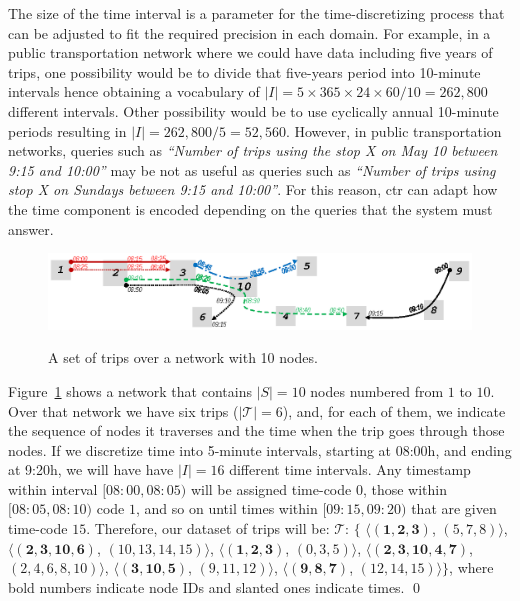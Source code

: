 	The size of the time interval is a parameter for the time-discretizing process
	that can be adjusted to fit the required precision in each domain.
	For example, in a public
	transportation network where we could have data including five years of trips, one
	possibility would be to divide that five-years period into
	10-minute intervals hence obtaining a
	vocabulary of $|I|=5\times 365 \times 24 \times 60/10 = 262,800$ different intervals. 
	Other possibility would
	be to use cyclically annual 10-minute periods resulting in $|I|=262,800 / 5 = 52,560$. 
	However,  in public transportation networks, queries such
	as \textit{``Number of trips using the stop X on May 10 between 9:15 and 10:00''} may be not 
	as useful as queries such as \textit{``Number of trips using stop X on Sundays between 9:15 and
		10:00''}.
	For this reason, \gls{ctr} can adapt how the
	time component is encoded depending on the queries that the system must answer.

	\begin{figure}[ht]
		\begin{center}
			{\includegraphics[width=1\textwidth]{figures/network_ctr.eps}}
		\end{center}
		\caption{A set of trips over a network with 10 nodes.}
		\label{fig:network}
	\end{figure}

	\begin{example} \label{exp:ctr}
	Figure~\ref{fig:network} shows a network that contains $|S|=10$ nodes 
	numbered from $1$ to $10$. Over that network we have six trips ($|\mathcal{T}|=6$),
	and, for each of them, we indicate the sequence of nodes it traverses
	and the time when the trip goes through those nodes. If we discretize time into
	5-minute intervals, starting at 08:00h, and ending at 9:20h, we will have
	have $|I|=16$ different time intervals. Any timestamp within
	interval $\mathit{[08\!:\!00,08\!:\!05)}$ will
	be assigned time-code $0$, those within $\mathit{[08\!:\!05,08\!:\!10)}$ code $1$, and so on until
	times within $\mathit{[09\!:\!15,09\!:\!20)}$ that are given time-code $15$.  
	Therefore, our dataset of trips will be: 
	$\mathcal{T}$: $\{$%
	$\langle (\mathbf{1,2,3     })$, $(\mathit{5,7,8})                     \rangle$, 
	$\langle (\mathbf{2,3,10,6  })$, $(\mathit{10,13,14,15})           \rangle$, 
	$\langle (\mathbf{1,2,3     })$, $(\mathit{0,3,5})                     \rangle$, 
	$\langle (\mathbf{2,3,10,4,7})$, $(\mathit{2,4,6,8,10}) \rangle$, 
	$\langle (\mathbf{3,10,5    })$, $(\mathit{9,11,12})                     \rangle$, 
	$\langle (\mathbf{9,8,7     })$, $(\mathit{12,14,15})                    \rangle$$\}$, 
	where bold numbers indicate node IDs and slanted ones indicate times. \qed
	\end{example}

